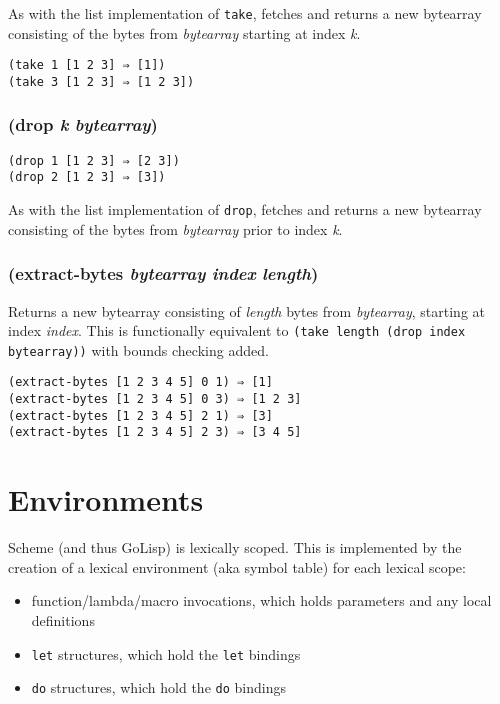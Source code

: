 \documentclass{article}
\begin{document}
As with the list implementation of \verb|take|, fetches and returns a new bytearray
consisting of the bytes from \emph{bytearray} starting at index \emph{k}.

\begin{verbatim}
(take 1 [1 2 3] ⇒ [1])
(take 3 [1 2 3] ⇒ [1 2 3])
\end{verbatim}

\subsubsection{(drop \emph{k} \emph{bytearray})}

\begin{verbatim}
(drop 1 [1 2 3] ⇒ [2 3])
(drop 2 [1 2 3] ⇒ [3])
\end{verbatim}

As with the list implementation of \verb|drop|, fetches and returns a new bytearray
consisting of the bytes from \emph{bytearray} prior to index \emph{k}.

\subsubsection{(extract-bytes \emph{bytearray} \emph{index} \emph{length})}

Returns a new bytearray consisting of \emph{length} bytes from \emph{bytearray}, starting at
index \emph{index}. This is functionally equivalent to
\verb|(take length (drop index bytearray))| with bounds checking added.

\begin{verbatim}
(extract-bytes [1 2 3 4 5] 0 1) ⇒ [1]
(extract-bytes [1 2 3 4 5] 0 3) ⇒ [1 2 3]
(extract-bytes [1 2 3 4 5] 2 1) ⇒ [3]
(extract-bytes [1 2 3 4 5] 2 3) ⇒ [3 4 5]
\end{verbatim}

\section{Environments}\label{sec:environments}

Scheme (and thus GoLisp) is lexically scoped. This is implemented by the creation of a lexical
environment (aka symbol table) for each lexical scope:

\begin{itemize}
\item function/lambda/macro invocations, which holds parameters and any local
definitions
\item \verb|let| structures, which hold the \verb|let| bindings
\item \verb|do| structures, which hold the \verb|do| bindings
\end{itemize}
\end{document}
